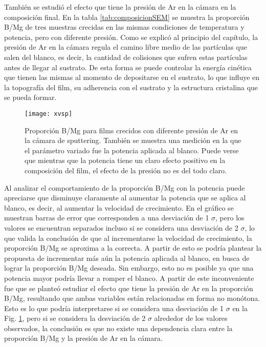 También se estudió el efecto que tiene la presión de Ar en la cámara en la composición final. En la tabla \ref{tab:composicionSEM} se muestra la proporción B/Mg de tres muestras crecidas en las mismas condiciones de temperatura y potencia, pero con diferente presión. Como se explicó al principio del capítulo, la presión de Ar en la cámara regula el camino libre medio de las partículas que salen del blanco, es decir, la cantidad de colisiones que sufren estas partículas antes de llegar al sustrato. De esta forma se puede controlar la energía cinética que tienen las mismas al momento de depositarse en el sustrato, lo que influye en la topografía del film, su adherencia con el sustrato y la estructura cristalina que se pueda formar.
 \begin{figure}[tbh!]
   \begin{center}
	 \texttt{[image: xvsp]}
   \end{center}
   \caption[Proporción B/Mg para films crecidos con diferente presión de Ar en la cámara de sputtering.]{Proporción B/Mg para films crecidos con diferente presión de Ar en la cámara de sputtering. También se muestra una medición en la que el parámetro variado fue la potencia aplicada al blanco. Puede verse que mientras que la potencia tiene un claro efecto positivo en la composición del film, el efecto de la presión no es del todo claro.}
   \label{fig:xvsp}
 \end{figure}
\newpage

 Al analizar el comportamiento de la proporción B/Mg con la potencia puede apreciarse que disminuye claramente al aumentar la potencia que se aplica al blanco, es decir, al aumentar la velocidad de crecimiento. En el gráfico se muestran barras de error que corresponden a una desviación de 1 $\sigma$, pero los valores se encuentran separados incluso si se considera una desviación de 2 $\sigma$, lo que valida la conclusión de que al incrementarse la velocidad de crecimiento, la proporción B/Mg se aproxima a la correcta. A partir de esto se podría plantear la propuesta de incrementar más aún la potencia aplicada al blanco, en busca de lograr la proporción B/Mg deseada. Sin embargo, esto no es posible ya que una potencia mayor podría llevar a romper el blanco. A partir de este inconveniente fue que se planteó estudiar el efecto que tiene la presión de Ar en la proporción B/Mg, resultando que ambas variables están relacionadas en forma no monótona. Esto es lo que podría interpretarse si se considera una desviación
\noindent
 de 1 $\sigma$ en la Fig. \ref{fig:xvsp}, pero si se considera la desviación de 2 $\sigma$ alrededor de los valores observados, la conclusión es que no existe una dependencia clara entre la proporción B/Mg y la presión de Ar en la cámara.
